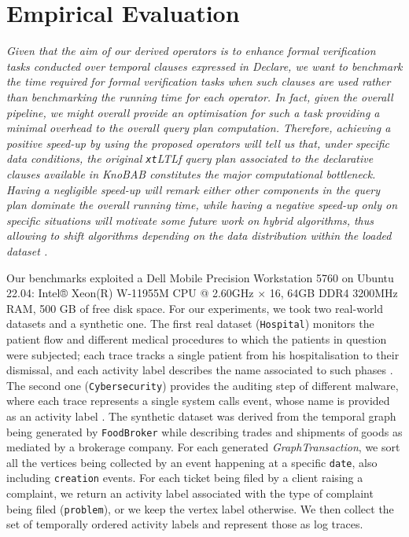 \documentclass[sigconf]{acmart}
\begin{document}
\section{Empirical Evaluation}\label{sec:empeval}
\textit{Given that the aim of our derived operators is to enhance formal verification tasks conducted over temporal clauses expressed in Declare, we want to benchmark the time required for formal verification tasks when such clauses are used rather than benchmarking the running time for each operator. In fact, given the overall pipeline, we might overall provide an optimisation for such a task providing a minimal overhead to the overall query plan computation. Therefore, achieving a positive speed-up by using the proposed operators will tell us that, under specific data conditions, the original \texttt{xt}LTL\textsf{f} query plan associated to the declarative clauses available in KnoBAB constitutes the major computational bottleneck. Having a negligible speed-up will remark either other components in the query plan dominate the overall running time, while having a negative speed-up only on specific situations will motivate some future work on hybrid algorithms, thus allowing to shift algorithms depending on the data distribution within the loaded dataset \cite{DBLP:journals/spe/Musser97}.} \medskip


Our benchmarks exploited a Dell Mobile Precision Workstation 5760 on Ubuntu 22.04: Intel® Xeon(R) W-11955M CPU @ 2.60GHz $\times$ 16, 64GB DDR4 3200MHz RAM, 500 GB of free disk space. For our experiments, we took two real-world datasets and a synthetic one. The first real dataset (\texttt{Hospital}) monitors the patient flow and different medical procedures to which the patients in question were subjected; each trace tracks a single patient from his hospitalisation to their dismissal, and each activity label describes the name associated to such phases \cite{https://doi.org/10.4121/uuid:d9769f3d-0ab0-4fb8-803b-0d1120ffcf54}. The second one (\texttt{Cybersecurity}) provides the auditing step of different malware, where each trace represents  a single system calls event, whose name is provided as an activity label \cite{10.7717/peerj-cs.346,DBLP:conf/siu/YaziCG19}.  The synthetic dataset was derived from the temporal graph being generated by \texttt{FoodBroker} \cite{DBLP:conf/wbdb/PetermannJMR14} while describing trades and shipments of goods as mediated by a brokerage company. For each generated \textit{GraphTransaction}, we sort all the vertices being collected by an event happening at a specific \texttt{date}, also including  \texttt{creation} events. For each ticket being filed by a client raising a complaint, we return an activity label associated with the type of complaint being filed (\texttt{problem}), or we keep the vertex label otherwise. We then collect the set of temporally ordered activity labels and represent those as log traces. 
\end{document}
